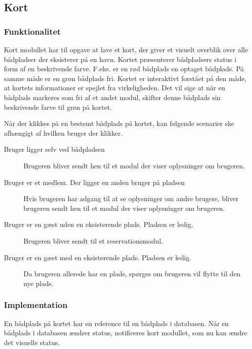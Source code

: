 \subsection{Kort}
\label{sub:kort}

\subsubsection{Funktionalitet}
\label{ssub:Funktionalitet}

Kort modullet har til opgave at lave et kort, der giver et visuelt overblik over alle bådpladser der eksisterer på en havn. Kortet præsenterer bådpladsers status i form af en beskrivende farve. F.eks. er en rød bådplads en optaget bådplads. På samme måde er en grøn bådplads fri. Kortet er interaktivt forstået på den måde, at kortets informationer er spejlet fra virkeligheden. Det vil sige at når en bådplads markeres som fri af et andet modul, skifter denne bådplads sin beskrivende farve til grøn på kortet.

Når der klikkes på en bestemt bådplads på kortet, kan følgende scenarier ske afhængigt af hvilken bruger der klikker.

\begin{description}
  \item[Bruger ligger selv ved bådpladsen] Brugeren bliver sendt hen til et modul der viser oplysninger om brugeren.
  \item[Bruger er et medlem. Der ligger en anden bruger på pladsen] Hvis brugeren har adgang til at se oplysninger om andre brugere, bliver brugeren sendt hen til et modul der viser oplysninger om brugeren.
  \item[Bruger er en gæst uden en eksisterende plads. Pladsen er ledig.] Brugeren bliver sendt til et reservationsmodul.
  \item[Bruger er en gæst med en eksisterende plads. Pladsen er ledig.] Da brugeren allerede har en plads, spørges om brugeren vil flytte til den nye plads.
\end{description}

\subsubsection{Implementation}
\label{ssub:Implementation}

En bådplads på kortet har en reference til en bådplads i databasen. Når en bådplads i databasen ændrer status, notificeres kort modullet, som nu kan ændre det visuelle status.

